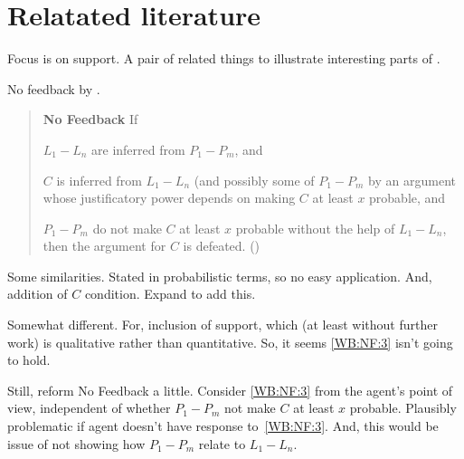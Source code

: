 \section{Relatated literature}
\label{sec:relatated-literature}

\begin{note}
  Focus is on support.
  A pair of related things to illustrate interesting parts of \nI{}.
\end{note}

\begin{note}
  No feedback by \citeauthor{Weisberg:2010to}.

  \begin{quote}
    \textbf{No Feedback} If
    \begin{enumerate*}[label=(\roman*), ref=(\roman*)]
    \item\label{WB:NF:1} \(L_{1}-L_{n}\) are inferred from \(P_{1}-P_{m}\), and
    \item\label{WB:NF:2} \(C\) is inferred from \(L_{1}-L_{n}\) (and possibly some of \(P_{1}-P_{m}\) by an argument whose justificatory power depends on making \(C\) at least \(x\) probable, and
    \item\label{WB:NF:3} \(P_{1}-P_{m}\) do not make \(C\) at least \(x\) probable without the help of \(L_{1}-L_{n}\), then the argument for \(C\) is defeated.\nolinebreak
      \mbox{}\hfill\mbox{(\citeyear[533--534]{Weisberg:2010to})}
    \end{enumerate*}
  \end{quote}

  Some similarities.
  Stated in probabilistic terms, so no easy application.
  And, addition of \(C\) condition.
  Expand to add this.

  Somewhat different.
  For, inclusion of support, which (at least without further work) is qualitative rather than quantitative.
  So, it seems \ref{WB:NF:3} isn't going to hold.

  Still, reform No Feedback a little.
  Consider \ref{WB:NF:3} from the agent's point of view, independent of whether \(P_{1}-P_{m}\) not make \(C\) at least \(x\) probable.
  Plausibly problematic if agent doesn't have response to~\ref{WB:NF:3}.
  And, this would be issue of not showing how \(P_{1}-P_{m}\) relate to \(L_{1}-L_{n}\).
\end{note}

